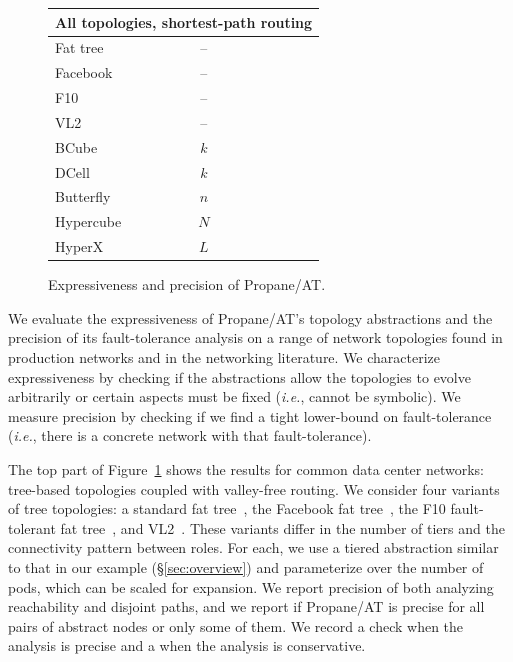 \documentclass[numbers, 10pt]{sigplanconf}
\newcommand{\IE}{\emph{i.e.}}
\newcommand{\sysname}{{\text{}\small \sf Propane/AT}\xspace}
\newcommand{\Conserv}{\cal{C}}
\newcommand{\cmark}{\ding{51}}
\newcommand{\xmark}{\ding{55}}
\begin{document}
\begin{figure}[t!]
\begin{center}
\begin{tabular}{| l | c| c | c | c | c | }
      \multicolumn{6}{l}{\textbf{All topologies, shortest-path routing}} \\ \hline

      Fat tree~\cite{fattree} & -- & \cmark & \cmark & \cmark & \Conserv  \\ \hline
      Facebook~\cite{facebook-fattree} & -- & \cmark & \cmark & \cmark & \cmark \\ \hline
      F10~\cite{f10-fattree} & -- & \cmark & \cmark & \cmark & \Conserv \\ \hline
      VL2~\cite{vl2-fattree} & -- & \cmark & \cmark & \cmark & \Conserv \\ \hline
      BCube~\cite{bcube} & $k$ & \cmark & \cmark & \Conserv & \Conserv \\ \hline
      DCell~\cite{dcell} & $k$ & \cmark & \cmark & \Conserv & \Conserv \\ \hline
      Butterfly~\cite{butterfly} & $n$ & \cmark & \cmark & \cmark & \cmark \\ \hline
      Hypercube & $N$ & \cmark & \cmark & \cmark & \cmark \\ \hline
      HyperX~\cite{hyperx} & $L$ & \cmark & \cmark & \cmark & \cmark \\ \hline
      \end{tabular}
  \end{center}
  \vspace{-.8em}
  \caption{Expressiveness and precision of \sysname.}
  \label{fig:analysis-precision}
  \vspace{-.8em}
\end{figure}


We evaluate the expressiveness of \sysname's topology abstractions and the precision of its fault-tolerance analysis on a range of network topologies found in production networks and in the networking literature. We characterize expressiveness by checking if the abstractions allow the topologies to evolve arbitrarily or certain aspects must be fixed (\IE, cannot be symbolic). We measure precision by checking if we find a tight lower-bound on fault-tolerance (\IE, there is a concrete network with that fault-tolerance).

The top part of Figure~\ref{fig:analysis-precision} shows the results for common data center networks: tree-based topologies coupled with valley-free routing.
We consider four variants of tree topologies: a standard fat tree~\cite{fattree}, the Facebook fat tree~\cite{facebook-fattree}, the F10 fault-tolerant fat tree~\cite{f10-fattree}, and VL2~\cite{vl2-fattree}. These variants differ in the number of tiers and the connectivity pattern between roles. For each, we use a tiered abstraction similar to that in our example (\S\ref{sec:overview}) and parameterize over the number of pods, which can be scaled for expansion. We report precision of both analyzing reachability and disjoint paths, and we report if \sysname is precise for all pairs of abstract nodes or only some of them. We record a check when the analysis is precise and a \Conserv{} when the analysis is conservative.
\end{document}
